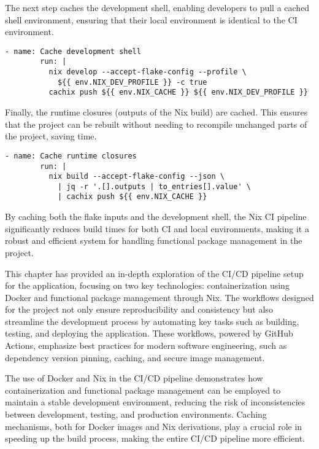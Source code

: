 The next step caches the development shell, enabling developers to pull a cached
shell environment, ensuring that their local environment is identical to the CI
environment.

\begin{lstlisting}[caption={Caching the Development Shell}]
      - name: Cache development shell
        run: |
          nix develop --accept-flake-config --profile \
            ${{ env.NIX_DEV_PROFILE }} -c true
          cachix push ${{ env.NIX_CACHE }} ${{ env.NIX_DEV_PROFILE }}
\end{lstlisting}

Finally, the runtime closures (outputs of the Nix build) are cached. This ensures
that the project can be rebuilt without needing to recompile unchanged parts of
the project, saving time.

\begin{lstlisting}[caption={Caching Runtime Closures}]
      - name: Cache runtime closures
        run: |
          nix build --accept-flake-config --json \
            | jq -r '.[].outputs | to_entries[].value' \
            | cachix push ${{ env.NIX_CACHE }}
\end{lstlisting}

By caching both the flake inputs and the development shell, the Nix CI pipeline
significantly reduces build times for both CI and local environments, making it
a robust and efficient system for handling functional package management in the
project.

This chapter has provided an in-depth exploration of the CI/CD pipeline setup for
the application, focusing on two key technologies: containerization using Docker
and functional package management through Nix. The workflows designed for the
project not only ensure reproducibility and consistency but also streamline the
development process by automating key tasks such as building, testing, and deploying
the application. These workflows, powered by GitHub Actions, emphasize best practices
for modern software engineering, such as dependency version pinning, caching, and
secure image management.

The use of Docker and Nix in the CI/CD pipeline demonstrates how containerization
and functional package management can be employed to maintain a stable development
environment, reducing the risk of inconsistencies between development, testing,
and production environments. Caching mechanisms, both for Docker images and Nix
derivations, play a crucial role in speeding up the build process, making the entire
CI/CD pipeline more efficient.

